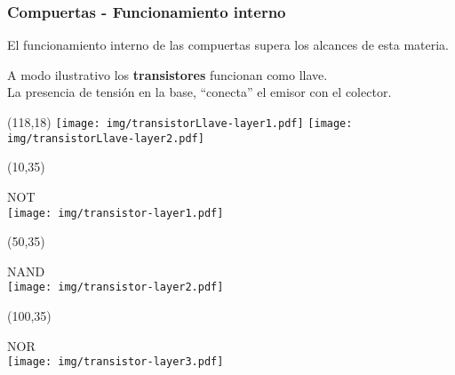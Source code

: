 \documentclass[aspectratio=169]{beamer}
\begin{document}
\begin{frame}[fragile,t]
    \frametitle{Compuertas - Funcionamiento interno}
     \textcolor{verdeuca}{El funcionamiento interno de las compuertas supera los alcances de esta materia.}\\
     \bigskip
     
     A modo ilustrativo los \textbf{transistores} funcionan como llave.\\
     La presencia de tensión en la \textcolor{v}{base}, ``conecta'' el \textcolor{naranjauca}{emisor} con el \textcolor{AzulClaro}{colector}.\\
     
    \begin{textblock}{50}(118,18) \texttt{[image: img/transistorLlave-layer1.pdf]} \hspace{0.5cm} \texttt{[image: img/transistorLlave-layer2.pdf]} \end{textblock}

    \begin{textblock}{50}(10,35) \begin{center} NOT\\ \vspace{0.5cm} \texttt{[image: img/transistor-layer1.pdf]} \end{center} \end{textblock}
    \begin{textblock}{50}(50,35) \begin{center} NAND\\ \vspace{0.5cm} \texttt{[image: img/transistor-layer2.pdf]} \end{center} \end{textblock}
    \begin{textblock}{50}(100,35) \begin{center} NOR\\ \vspace{0.5cm} \texttt{[image: img/transistor-layer3.pdf]} \end{center} \end{textblock}
    
\end{frame}
\end{document}
